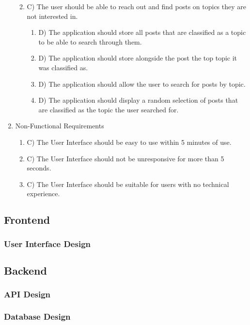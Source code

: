 \begin{enumerate}
\begin{enumerate}
\begin{enumerate}
        \end{enumerate}
        \item C) The user should be able to reach out and find posts on topics they are not interested in.
        \begin{enumerate}
            \item D) The application should store all posts that are classified as a topic to be able to search through them.
            \item D) The application should store alongside the post the top topic it was classified as.
            \item D) The application should allow the user to search for posts by topic.
            \item D) The application should display a random selection of posts that are classified as the topic the user searched for.
        \end{enumerate}
    \end{enumerate}
    \item Non-Functional Requirements
    \begin{enumerate}
        \item C) The User Interface should be easy to use within 5 minutes of use.
        \item C) The User Interface should not be unresponsive for more than 5 seconds.
        \item C) The User Interface should be suitable for users with no technical experience.
    \end{enumerate}
\end{enumerate}

\subsection{Frontend}
\subsubsection{User Interface Design}
\subsection{Backend}
\subsubsection{API Design}
\subsubsection{Database Design}